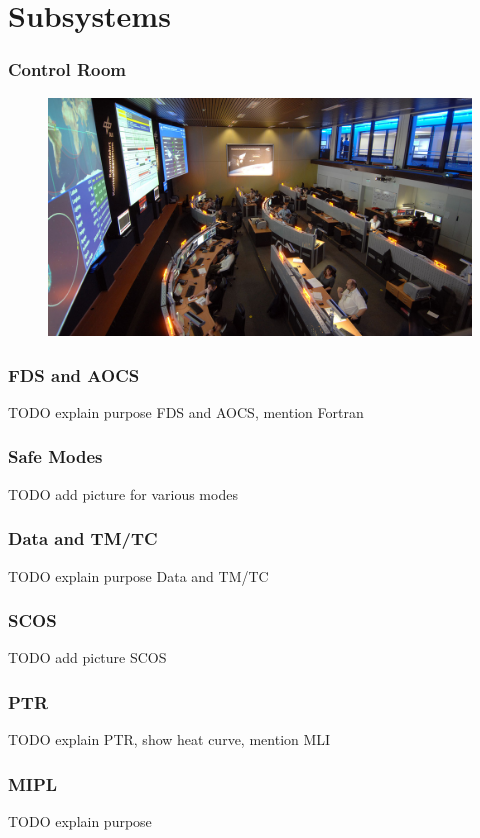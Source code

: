 \documentclass[12pt,utf8,notheorems,compress]{beamer}
\begin{document}
\section{Subsystems}

\begin{frame}
  \frametitle{Control Room}
  \pause
  \begin{figure}[!ht]
    \centering
    \includegraphics[width=\textwidth]{k1.jpg}
  \end{figure}
\end{frame}

\begin{frame}
  \frametitle{FDS and AOCS}
  \pause
  TODO explain purpose FDS and AOCS, mention Fortran
\end{frame}

\begin{frame}
  \frametitle{Safe Modes}
  \pause
  TODO add picture for various modes
\end{frame}

\begin{frame}
  \frametitle{Data and TM/TC}
  \pause
  TODO explain purpose Data and TM/TC
\end{frame}

\begin{frame}
  \frametitle{SCOS}
  \pause
  TODO add picture SCOS
\end{frame}

\begin{frame}
  \frametitle{PTR}
  \pause
  TODO explain PTR, show heat curve, mention MLI
\end{frame}

\begin{frame}
  \frametitle{MIPL}
  \pause
  TODO explain purpose
\end{frame}
\end{document}

